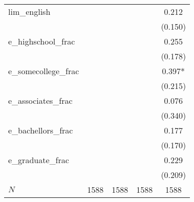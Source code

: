 {\begin{tabular}{l*{4}{c}}
\addlinespace
lim\_english&            &            &            &    0.212   \\
          &            &            &            &  (0.150)   \\
\addlinespace
e\_highschool\_frac&            &            &            &    0.255   \\
          &            &            &            &  (0.178)   \\
\addlinespace
e\_somecollege\_frac&            &            &            &    0.397*  \\
          &            &            &            &  (0.215)   \\
\addlinespace
e\_associates\_frac&            &            &            &    0.076   \\
          &            &            &            &  (0.340)   \\
\addlinespace
e\_bachellors\_frac&            &            &            &    0.177   \\
          &            &            &            &  (0.170)   \\
\addlinespace
e\_graduate\_frac&            &            &            &    0.229   \\
          &            &            &            &  (0.209)   \\
\midrule
\(N\)     &     1588   &     1588   &     1588   &     1588   \\
\bottomrule
\end{tabular}
}
